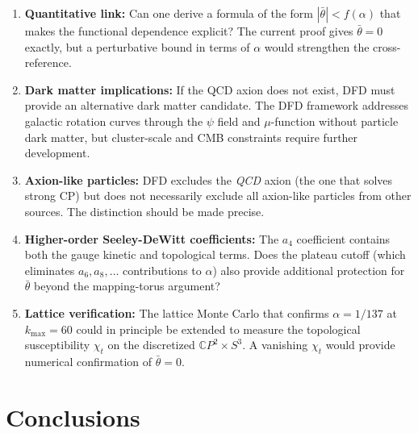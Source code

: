 \documentclass[11pt]{article}
\theoremstyle{remark}
\begin{document}
\begin{enumerate}
\item \textbf{Quantitative link:} Can one derive a formula of the form
  $|\bar\theta| < f(\alpha)$ that makes the functional dependence explicit?
  The current proof gives $\bar\theta = 0$ exactly, but a perturbative
  bound in terms of $\alpha$ would strengthen the cross-reference.

\item \textbf{Dark matter implications:} If the QCD axion does not exist,
  DFD must provide an alternative dark matter candidate.  The DFD framework
  addresses galactic rotation curves through the $\psi$ field and $\mu$-function
  without particle dark matter, but cluster-scale and CMB constraints require
  further development.

\item \textbf{Axion-like particles:} DFD excludes the \emph{QCD} axion
  (the one that solves strong CP) but does not necessarily exclude all
  axion-like particles from other sources.  The distinction should be
  made precise.

\item \textbf{Higher-order Seeley-DeWitt coefficients:} The $a_4$ coefficient
  contains both the gauge kinetic and topological terms.  Does the plateau
  cutoff (which eliminates $a_6, a_8, \ldots$ contributions to $\alpha$) also
  provide additional protection for $\bar\theta$ beyond the mapping-torus
  argument?

\item \textbf{Lattice verification:} The lattice Monte Carlo that confirms
  $\alpha = 1/137$ at $k_{\max} = 60$ could in principle be extended to
  measure the topological susceptibility $\chi_t$ on the discretized
  $\mathbb{C}P^2 \times S^3$.  A vanishing $\chi_t$ would provide numerical
  confirmation of $\bar\theta = 0$.
\end{enumerate}

\section{Conclusions}
\end{document}
